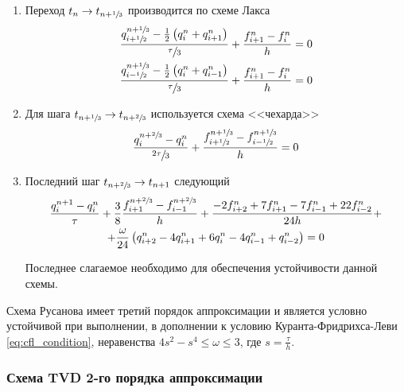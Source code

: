 \begin{enumerate}
    \item Переход $t_n \rightarrow t_{n+\sfrac{1}{3}}$ производится по схеме Лакса
    \begin{equation}
    \begin{gathered}
        \dfrac{q^{n+\sfrac{1}{3}}_{i+\sfrac{1}{2}} - \frac{1}{2}\left(q^n_i + q^n_{i+1}\right)}{\sfrac{\tau}{3}} + \dfrac{f^n_{i+1} - f^n_{i}}{h} = 0 \\
        \dfrac{q^{n+\sfrac{1}{3}}_{i-\sfrac{1}{2}} - \frac{1}{2}\left(q^n_i + q^n_{i-1}\right)}{\sfrac{\tau}{3}} + \dfrac{f^n_{i+1} - f^n_{i}}{h} = 0
    \end{gathered}
   \end{equation}
 
    \item Для шага $t_{n+\sfrac{1}{3}} \rightarrow t_{n+\sfrac{2}{3}}$ используется схема <<чехарда>>
    \begin{equation}
        \dfrac{q^{n+\sfrac{2}{3}}_{i} - q^n_i}{\sfrac{2\tau}{3}} + \dfrac{f^{n+\sfrac{1}{3}}_{i+\sfrac{1}{2}} - f^{n+\sfrac{1}{3}}_{i-\sfrac{1}{2}}}{h} = 0
    \end{equation}

    \item Последний шаг $t_{n+\sfrac{2}{3}} \rightarrow t_{n+1}$ следующий
    \begin{equation}
    \begin{gathered}
        \dfrac{q^{n+1}_i - q^n_i}{\tau} + \dfrac{3}{8}\dfrac{f^{n+\sfrac{2}{3}}_{i+1} - f^{n+\sfrac{2}{3}}_{i-1}}{h} + \dfrac{-2f^n_{i+2} + 7f^n_{i+1} -  7f^n_{i-1} +22f^n_{i-2}}{24h} +\\+ \dfrac{\omega}{24}\left(q^n_{i+2}-  4q^n_{i+1} + 6q^n_{i} - 4 q^n_{i-1} + q^n_{i-2}\right) = 0
    \end{gathered}
    \end{equation}
    
    Последнее слагаемое необходимо для обеспечения устойчивости данной схемы.
\end{enumerate}

Схема Русанова имеет третий порядок аппроксимации и является условно устойчивой при выполнении, в дополнении к условию Куранта-Фридрихса-Леви \eqref{eq:cfl_condition}, неравенства $4s^2 - s^4 \leq \omega \leq 3$, где $s = \frac{\tau}{h}$.

\subsubsection{Схема TVD 2-го порядка аппроксимации}

